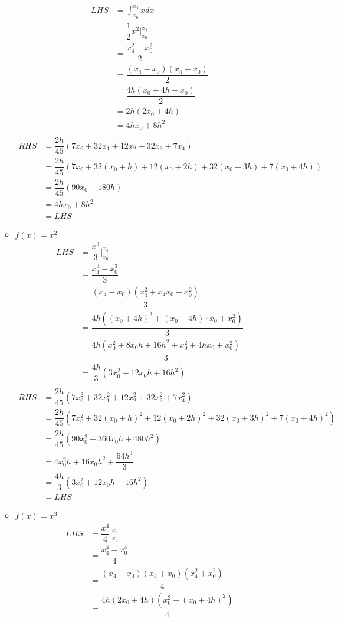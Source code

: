 \documentclass{article}
\begin{document}
\begin{enumerate}
\begin{itemize}
\begin{align*}
LHS &=\int_{x_0}^{x_4} x dx\\
&=\dfrac{1}{2} x^2|_{x_0}^{x_4}\\
&=\dfrac{x_4^2 - x_0^2}{2}\\ 
&=\dfrac{(x_4 - x_0)(x_4+x_0)}{2}\\ 
&=\dfrac{4h(x_0+4h+x_0)}{2}\\ 
&=2h(2x_0+4h)\\
&=4hx_0+8h^2\\
\end{align*}
\begin{align*}
RHS &=\dfrac{2h}{45}(7x_0+32x_1+12x_2+32x_3+7x_4)\\
&=\dfrac{2h}{45}(7x_0+32(x_0+h)+12(x_0+2h)+32(x_0+3h)+7(x_0+4h))\\
&=\dfrac{2h}{45}(90x_0+180h)\\
&=4hx_0+8h^2\\&=LHS
\end{align*}
\item $f(x) =x^2$
\begin{align*}
LHS &=\dfrac{x^3}{3}|_{x_0}^{x_4}\\
&=\dfrac{x_4^3-x_0^3}{3}\\
&=\dfrac{(x_4-x_0)(x_4^2+x_4x_0+x_0^2)}{3}\\
&=\dfrac{4h((x_0+4h)^2+(x_0+4h)\cdot x_0+x_0^2)}{3}\\
&=\dfrac{4h(x_0^2+8x_0h+16h^2+x_0^2+4hx_0+x_0^2)}{3}\\
&=\dfrac{4h}{3}(3x_0^2+12x_0h+16h^2)\\
\end{align*}
\begin{align*}
RHS &=\dfrac{2h}{45}(7x_0^2+32x_1^2+12x_2^2+32x_3^2+7x_4^2)\\
&=\dfrac{2h}{45}(7x_0^2+32(x_0+h)^2+12(x_0+2h)^2+32(x_0+3h)^2+7(x_0+4h)^2)\\
&=\dfrac{2h}{45}(90x_0^2+360x_0h+480h^2)\\
&=4x_0^2h+16x_0h^2+\dfrac{64 h^3}{3}\\
&=\dfrac{4h}{3}(3x_0^2+12x_0h+16h^2)\\&=LHS
\end{align*}
\item $f(x) = x^3$
\begin{align*}
LHS &=\dfrac{x^4}{4}|_{x_0}^{x_4}\\
&=\dfrac{x_4^4-x_0^4}{4}\\
&=\dfrac{(x_4-x_0)(x_4+x_0)(x_4^2+x_0^2)}{4}\\
&=\dfrac{4h(2x_0+4h)(x_0^2+(x_0+4h)^2)}{4}\\

\end{align*}
\end{itemize}
\end{enumerate}
\end{document}
